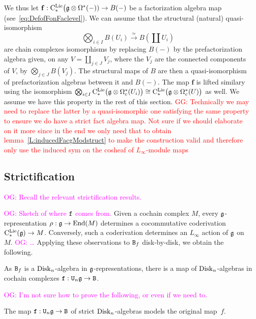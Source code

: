 \documentclass[11pt]{amsart}
\numberwithin{equation}{section}
\def\owen{\textcolor{magenta}{OG: }\textcolor{magenta}}
\def\greg{\textcolor{red}{GG: }\textcolor{red}}
\begin{document}
\smallskip 

We thus let $\mathbf{f}: {\rm C}^{\rm Lie}_*\big(\mathfrak g \otimes \Omega^* (-)) \to B(-)$ be a factorization algebra map (see~\eqref{eq:DefofFonFaclevel}). We can 
assume that the structural (natural) quasi-isomorphism
$$\bigotimes_{i\in I} B(U_i) 
\stackrel{\simeq}\longrightarrow B(\coprod  U_i)$$ are chain complexes isomorphisms by replacing $B(-)$ by the prefactorization algebra 
given, on any $V=\coprod_{j\in J} V_j$, where the $V_j$ are the connected components of $V$, by   $\mathop{\bigotimes}\limits_{j\in J} B(V_j)$. 
The structural maps of $B$ are then a quasi-isomorphism of prefactorization algebras between it and $B(-)$. The map $\mathbf{f}$ is lifted similary using 
the isomorphism $\bigotimes_{i\in I} {\rm C}^{\rm Lie}_*\big(\mathfrak g \otimes \Omega_c^* (U_i)\big) \cong
{\rm C}^{\rm Lie}_*\big(\mathfrak g \otimes \Omega_c^* (U)\big)$ as well. We assume we have this property in the rest of this section.
\greg{Technically we may need to replace the latter by a quasi-isomorphic one satisfying the same property to ensure we do have a strict fact algebra map. 
Not sure if we should elaborate on it more since in the end we only need that to obtain lemma~\ref{L:inducedFacgModstruct} to make the construction valid 
and therefore only use the induced sym on the cosheaf of $L_\infty$-module maps}

\subsection{Strictification}

\owen{Recall the relevant strictification results.}

\owen{Sketch of where ${\tt f}$ comes from.}
Given a cochain complex $M$, every $\mathfrak g$-representation $\rho: \mathfrak g \to {\rm End}(M)$ determines a cocommutative coderivation ${\rm C}^{\rm Lie}_*(\mathfrak g) \to M$.
Conversely, such a coderivation determines an $L_\infty$ action of $\mathfrak g$ on $M$.
\owen{\dots}
Applying these observations to ${\tt B}_f$ disk-by-disk, we obtain the following.

\begin{lmm}
As ${\tt B}_f$ is a ${\rm Disk}_n$-algebra in $\mathfrak g$-representations,
there is a map of ${\rm Disk}_n$-algebras in cochain complexes ${\tt f}:  {\tt U}_n \mathfrak g \to {\tt B}$.
\end{lmm}

\owen{I'm not sure how to prove the following, or even if we need to.}

\begin{prp}
The map ${\tt f}:  {\tt U}_n \mathfrak g \to {\tt B}$ of strict ${\rm Disk}_n$-algebras models the original map~$f$.
\end{prp}
\end{document}
